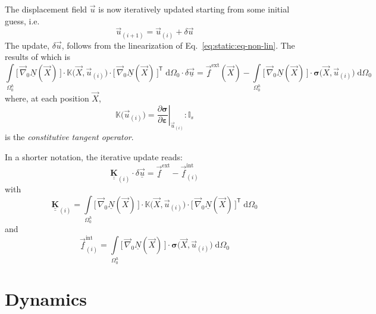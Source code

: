 \documentclass[times,namecite]{goose-article}
\begin{document}
The displacement field $\vec{u}$ is now iteratively updated starting from some initial guess, i.e.
\begin{equation}
  \vec{u}_{(i+1)} = \vec{u}_{(i)} + \delta \vec{u}
\end{equation}
The update, $\delta \vec{u}$, follows from the linearization of Eq.~\eqref{eq:static:eq-non-lin}. The results of which is
\begin{equation}
  \int\limits_{\Omega^h_0}
    \big[\, \vec{\nabla}_0 \underline{N}(\vec{X}) \,\big]
    \cdot
    \mathbb{K}\big(\vec{X},\vec{u}_{(i)}\big)
    \cdot
    \big[\, \vec{\nabla}_0 \underline{N}(\vec{X}) \,\big]^\mathsf{T} \;
  \mathrm{d}\Omega_0
  \cdot \delta \underline{\vec{u}}
  =
  \underline{\vec{f}}^\mathrm{ext}(\vec{X})
  -
  \int\limits_{\Omega^h_0}
    \big[\, \vec{\nabla}_0 \underline{N}(\vec{X}) \,\big]
    \cdot
    \bm{\sigma}\big(\vec{X},\vec{u}_{(i)}\big) \;
  \mathrm{d}\Omega_0
\end{equation}
where, at each position $\vec{X}$,
\begin{equation}
  \mathbb{K}\big(\vec{u}_{(i)}\big)
  =
  \left. \frac{\partial \bm{\sigma}}{\partial \bm{\varepsilon}} \right|_{\vec{u}_{(i)}}
  :
  \mathbb{I}_s
\end{equation}
is the \emph{constitutive tangent operator}.

In a shorter notation, the iterative update reads:
\begin{equation}
  \underline{\underline{\bm{K}}}_{(i)} \cdot \delta \underline{\vec{u}}
  =
  \underline{\vec{f}}^\mathrm{ext}
  -
  \underline{\vec{f}}^\mathrm{int}_{(i)}
\end{equation}
with
\begin{equation}
  \underline{\underline{\bm{K}}}_{(i)}
  =
  \int\limits_{\Omega^h_0}
    \big[\, \vec{\nabla}_0 \underline{N}(\vec{X}) \,\big]
    \cdot
    \mathbb{K}\big(\vec{X}, \vec{u}_{(i)}\big)
    \cdot
    \big[\, \vec{\nabla}_0 \underline{N}(\vec{X}) \,\big]^\mathsf{T} \;
  \mathrm{d}\Omega_0
\end{equation}
and
\begin{equation}
  \underline{\vec{f}}^\mathrm{int}_{(i)}
  =
  \int\limits_{\Omega^h_0}
    \big[\, \vec{\nabla}_0 \underline{N}(\vec{X}) \,\big]
    \cdot
    \bm{\sigma}\big(\vec{X}, \vec{u}_{(i)}\big) \;
  \mathrm{d}\Omega_0
\end{equation}

\section{Dynamics}
\end{document}
